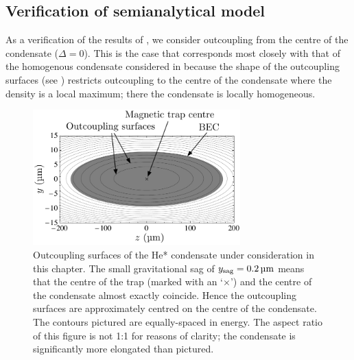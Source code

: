 \subsection{Verification of semianalytical model}

As a verification of the results of , we consider outcoupling from the centre of the condensate ($\Delta = 0$). This is the case that corresponds most closely with that of the homogenous condensate considered in  because the shape of the outcoupling surfaces (see ) restricts outcoupling to the centre of the condensate where the density is a local maximum; there the condensate is locally homogeneous.

\begin{figure}
    \centering
    \includegraphics[width=8cm]{OutcouplingSurfaces}
    \caption{Outcoupling surfaces of the He* condensate under consideration in this chapter.  The small gravitational sag of $y_\text{sag} = \unit[0.2]{\micro m}$ means that the centre of the trap (marked with an `$\times$') and the centre of the condensate almost exactly coincide.  Hence the outcoupling surfaces are approximately centred on the centre of the condensate.  The contours pictured are equally-spaced in energy.  The aspect ratio of this figure is not 1:1 for reasons of clarity; the condensate is significantly more elongated than pictured. \label{Peaks:OutcouplingSurfaces}}
\end{figure}

